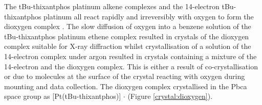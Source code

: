 The tBu-thixantphos platinum alkene complexes and the 14-electron tBu-thixantphos platinum all react rapidly and irreversibly with oxygen to form the dioxygen complex .  The slow diffusion of oxygen into a benzene solution of the tBu-thixantphos platinum ethene complex resulted in crystals of the dioxygen complex suitable for X-ray diffraction whilst crystallisation of a solution of the 14-electron complex under argon resulted in crystals containing a mixture of the 14-electron and the dioxygen complex.  This is either a result of co-crystallisation or due to molecules at the surface of the crystal reacting with oxygen during mounting and data collection.  The dioxygen complex crystallised in the Pbca space group as [Pt(tBu-thixantphos)] $\cdot{}$  (Figure \ref{crystal:dioxygen}).  
%
%
%
